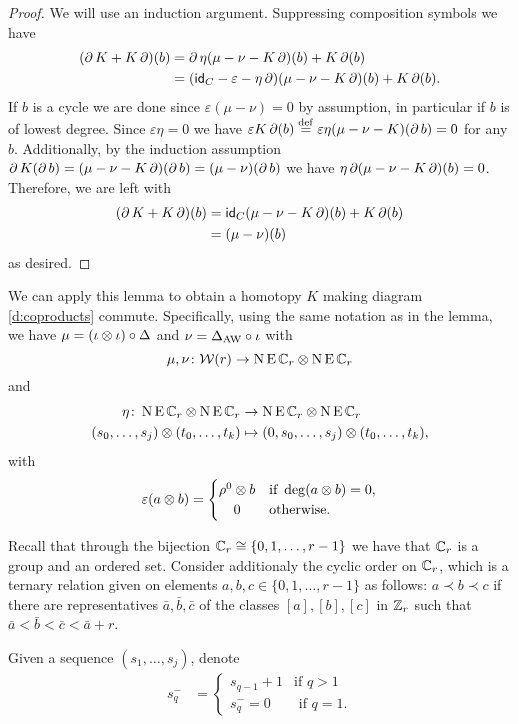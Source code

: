 \begin{proof}
	We will use an induction argument.
	Suppressing composition symbols we have
	\begin{align*}
		(\operatorname{\partial} K+ K\operatorname{\partial})(b)
		&= \operatorname{\partial} \eta(\mu-\nu-K\operatorname{\partial})(b) + K\operatorname{\partial}(b) \\
		&= (\mathsf{id}_C - \varepsilon - \eta\operatorname{\partial})(\mu-\nu - K\operatorname{\partial})(b) + K\operatorname{\partial}(b).
	\end{align*}
	If $b$ is a cycle we are done since $\varepsilon(\mu-\nu) = 0$ by assumption, in particular if $b$ is of lowest degree.
	Since $\varepsilon \eta = 0$ we have $\varepsilon K \operatorname{\partial}(b) \stackrel{\mathrm{def}}{=} \varepsilon \eta(\mu-\nu-K)(\operatorname{\partial} b) = 0$ for any $b$.
	Additionally, by the induction assumption $\operatorname{\partial} K (\operatorname{\partial} b) = (\mu-\nu-K\operatorname{\partial})(\operatorname{\partial} b) = (\mu-\nu)(\operatorname{\partial} b)$ we have $\eta \operatorname{\partial} (\mu-\nu - K\operatorname{\partial})(b) = 0$.
	Therefore, we are left with
	\begin{align*}
		(\operatorname{\partial} K+ K\operatorname{\partial})(b) &=
		\mathsf{id}_C(\mu-\nu-K\operatorname{\partial})(b)+K\operatorname{\partial}(b) \\&=
		(\mu-\nu)(b)
	\end{align*}
	as desired.
\end{proof}

We can apply this lemma to obtain a homotopy $K$ making diagram \eqref{d:coproducts} commute.
Specifically, using the same notation as in the lemma, we have $\mu = (\iota \otimes \iota) \circ \Delta$ and $\nu = \Delta_{\operatorname{AW}} \circ \iota$ with
\[
\mu,\nu \colon \mathcal{W}(r) \to \operatorname{N}\operatorname{E}\mathbb{C}_r \otimes \operatorname{N}\operatorname{E}\mathbb{C}_r
\]
and
\begin{align*}
	\eta \colon \operatorname{N}\operatorname{E}\mathbb{C}_r \otimes \operatorname{N}\operatorname{E}\mathbb{C}_r &\to \operatorname{N}\operatorname{E}\mathbb{C}_r \otimes \operatorname{N}\operatorname{E}\mathbb{C}_r \\
	(s_0,\dots,s_j) \otimes (t_0,\dots,t_k) &\mapsto (0,s_0,\dots,s_j) \otimes (t_0,\dots,t_k),
\end{align*}
with
\[
\varepsilon(a \ot b) =
\begin{cases}
	\rho^0 \ot b & \text{if } \deg(a \ot b) = 0, \\
	\hfil0 & \text{otherwise}.
\end{cases}
\]

Recall that through the bijection $\mathbb{C}_r\cong\{0,1,\ldots,r-1\}$ we have that $\mathbb{C}_r$ is a group and an ordered set. Consider additionaly the cyclic order on $\mathbb{C}_r$, which is a ternary relation given on elements $a,b,c\in \{0,1,\dots,r-1\}$ as follows: $a\prec b\prec c$
if there are representatives $\bar{a},\bar{b},\bar{c}$ of the classes $[a],[b],[c]$ in $\mathbb{Z}_r$ such that $\bar{a}<\bar{b}<\bar{c}<\bar{a}+r$.

\begin{definition}
	Given a sequence $(s_1,\ldots,s_j)$, denote
	\begin{align*}
		s_q^- &= \begin{cases}s_{q-1}+1 & \text{if $q>1$}\\
			s_q^- = 0 & \text{ if $q=1$.}
		\end{cases}
	\end{align*}
\end{definition}


